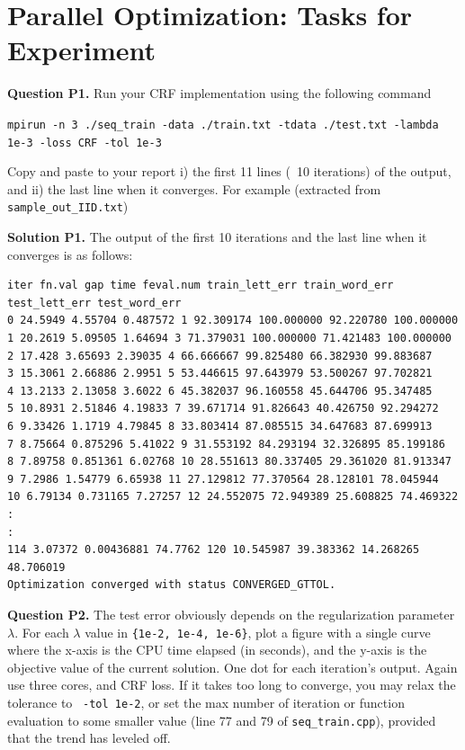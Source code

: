 \documentclass[11pt]{report}
\begin{document}
\maketitle

\section{Parallel Optimization: Tasks for Experiment}

{\bf Question P1.}
Run your CRF implementation using the following command

{\small
\verb!mpirun -n 3 ./seq_train -data ./train.txt -tdata ./test.txt -lambda 1e-3 -loss CRF -tol 1e-3!
}
\vspace{-1em}

Copy and paste to your report
i) the first 11 lines (\ie\ 10 iterations) of the output,
and
ii) the last line when it converges.
%
For example (extracted from \verb!sample_out_IID.txt!)

{\bf Solution P1.}
The output of the first 10 iterations and the last line when it converges is as follows:

\vspace{-1em}
\begin{verbatim}
iter fn.val gap time feval.num train_lett_err train_word_err test_lett_err test_word_err
0 24.5949 4.55704 0.487572 1 92.309174 100.000000 92.220780 100.000000
1 20.2619 5.09505 1.64694 3 71.379031 100.000000 71.421483 100.000000
2 17.428 3.65693 2.39035 4 66.666667 99.825480 66.382930 99.883687
3 15.3061 2.66886 2.9951 5 53.446615 97.643979 53.500267 97.702821
4 13.2133 2.13058 3.6022 6 45.382037 96.160558 45.644706 95.347485
5 10.8931 2.51846 4.19833 7 39.671714 91.826643 40.426750 92.294272
6 9.33426 1.1719 4.79845 8 33.803414 87.085515 34.647683 87.699913
7 8.75664 0.875296 5.41022 9 31.553192 84.293194 32.326895 85.199186
8 7.89758 0.851361 6.02768 10 28.551613 80.337405 29.361020 81.913347
9 7.2986 1.54779 6.65938 11 27.129812 77.370564 28.128101 78.045944
10 6.79134 0.731165 7.27257 12 24.552075 72.949389 25.608825 74.469322
:
:
114 3.07372 0.00436881 74.7762 120 10.545987 39.383362 14.268265 48.706019
Optimization converged with status CONVERGED_GTTOL.
\end{verbatim}

{\bf Question P2.}
The test error obviously depends on the regularization parameter $\lambda$. For each $\lambda$ value in \verb!{1e-2, 1e-4, 1e-6}!, plot a figure with a single curve where the x-axis is the CPU time elapsed (in seconds), and the y-axis is the objective value of the current solution.
One dot for each iteration's output.
Again use three cores, and CRF loss.
If it takes too long to converge,
you may relax the tolerance to \eg\ \verb!-tol 1e-2!,
or set the max number of iteration or function evaluation to some smaller value
(line 77 and 79 of \verb!seq_train.cpp!),
provided that the trend has leveled off.
\end{document}
